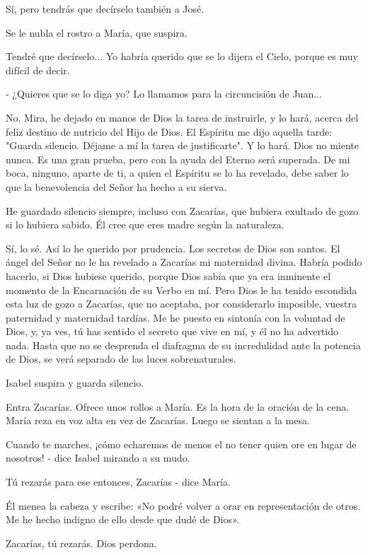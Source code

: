 \documentclass[12pt]{book} %
\begin{document}
Sí, pero tendrás que decírselo también a José. 

Se le nubla el rostro a María, que suspira. 

Tendré que decírselo... Yo habría querido que se lo dijera el Cielo, porque es muy difícil de decir. 

- ¿Quieres que se lo diga yo? Lo llamamos para la circuncisión de Juan... 

No. Mira, he dejado en manos de Dios la tarea de instruirle, y lo hará, acerca del feliz destino de nutricio del Hijo de Dios. El Espíritu me dijo aquella tarde: "Guarda silencio. Déjame a mí la tarea de justificarte". Y lo hará. Dios no miente nunca. Es una gran prueba, pero con la ayuda del Eterno será superada. De mi boca, ninguno, aparte de ti, a quien el Espíritu se lo ha revelado, debe saber lo que la benevolencia del Señor ha hecho a su sierva. 

He guardado silencio siempre, incluso con Zacarías, que hubiera exultado de gozo si lo hubiera sabido. Él cree que eres madre según la naturaleza. 

Sí, lo sé. Así lo he querido por prudencia. Los secretos de Dios son santos. El ángel del Señor no le ha revelado a Zacarías mi maternidad divina. Habría podido hacerlo, si Dios hubiese querido, porque Dios sabía que ya era inminente el momento de la Encarnación de su Verbo en mí. Pero Dios le ha tenido escondida esta luz de gozo a Zacarías, que no aceptaba, por considerarlo imposible, vuestra paternidad y maternidad tardías. Me he puesto en sintonía con la voluntad de Dios, y, ya ves, tú has sentido el secreto que vive en mí, y él no ha advertido nada. Hasta que no se desprenda el diafragma de su incredulidad ante la potencia de Dios, se verá separado de las luces sobrenaturales. 

Isabel suspira y guarda silencio. 

Entra Zacarías. Ofrece unos rollos a María. Es la hora de la oración de la cena. María reza en voz alta en vez de Zacarías. Luego se sientan a la mesa. 

Cuando te marches, ¡cómo echaremos de menos el no tener quien ore en lugar de nosotros! - dice Isabel mirando a su mudo. 

Tú rezarás para ese entonces, Zacarías - dice María. 

Él menea la cabeza y escribe: «No podré volver a orar en representación de otros. Me he hecho indigno de ello desde que dudé de Dios». 

Zacarías, tú rezarás. Dios perdona. 
\end{document}
